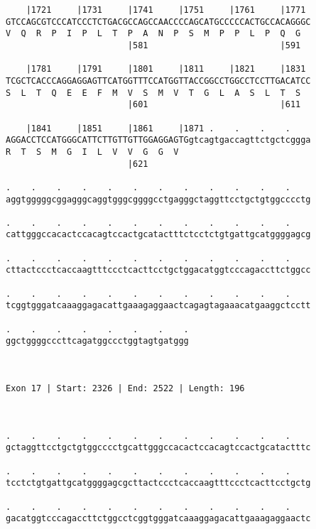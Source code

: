\documentclass{article}
\begin{document}
\begin{Verbatim}
    |1721     |1731     |1741     |1751     |1761     |1771 
GTCCAGCGTCCCATCCCTCTGACGCCAGCCAACCCCAGCATGCCCCCACTGCCACAGGGC
V  Q  R  P  I  P  L  T  P  A  N  P  S  M  P  P  L  P  Q  G  
                        |581                          |591  
  
    |1781     |1791     |1801     |1811     |1821     |1831 
TCGCTCACCCAGGAGGAGTTCATGGTTTCCATGGTTACCGGCCTGGCCTCCTTGACATCC
S  L  T  Q  E  E  F  M  V  S  M  V  T  G  L  A  S  L  T  S  
                        |601                          |611  
  
    |1841     |1851     |1861     |1871 .    .    .    .    
AGGACCTCCATGGGCATTCTTGTTGTTGGAGGAGTGgtcagtgaccagttctgctcggga
R  T  S  M  G  I  L  V  V  G  G  V                          
                        |621                                
  
.    .    .    .    .    .    .    .    .    .    .    .    
aggtgggggcggagggcaggtgggcggggcctgagggctaggttcctgctgtggcccctg
                                                            
.    .    .    .    .    .    .    .    .    .    .    .    
cattgggccacactccacagtccactgcatactttctcctctgtgattgcatggggagcg
                                                            
.    .    .    .    .    .    .    .    .    .    .    .    
cttactccctcaccaagtttccctcacttcctgctggacatggtcccagaccttctggcc
                                                            
.    .    .    .    .    .    .    .    .    .    .    .    
tcggtgggatcaaaggagacattgaaagaggaactcagagtagaaacatgaaggctcctt
                                                            
.    .    .    .    .    .    .    .
ggctggggcccttcagatggccctggtagtgatggg
                                    
                                    
 
Exon 17 | Start: 2326 | End: 2522 | Length: 196



.    .    .    .    .    .    .    .    .    .    .    .    
gctaggttcctgctgtggcccctgcattgggccacactccacagtccactgcatactttc
                                                            
.    .    .    .    .    .    .    .    .    .    .    .    
tcctctgtgattgcatggggagcgcttactccctcaccaagtttccctcacttcctgctg
                                                            
.    .    .    .    .    .    .    .    .    .    .    .    
gacatggtcccagaccttctggcctcggtgggatcaaaggagacattgaaagaggaactc
                                                            

\end{Verbatim}
\end{document}
